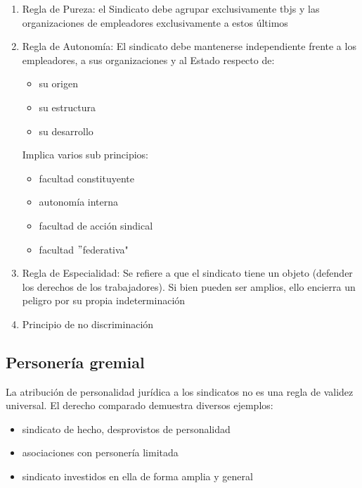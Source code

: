 \documentclass[spanish,12pt,a4paper,titlepage]{report}
\begin{document}
\begin{enumerate}
\item Regla de Pureza: el Sindicato debe agrupar exclusivamente tbjs y las organizaciones de empleadores exclusivamente a estos últimos
\item Regla de Autonomía: El sindicato debe mantenerse independiente frente a los empleadores, a sus organizaciones y al Estado respecto de:
	\begin{itemize}
	\item su origen
	\item su estructura
	\item su desarrollo
	\end{itemize}

Implica varios sub principios:
	\begin{itemize}
	\item facultad constituyente
	\item autonomía interna
	\item facultad de acción sindical
	\item facultad $"$federativa"
	\end{itemize}
	
\item Regla de Especialidad: Se refiere a que el sindicato tiene un objeto (defender los derechos de los trabajadores). Si bien pueden ser amplios, ello encierra un peligro por su propia indeterminación
\item Principio de no discriminación
\end{enumerate}

\subsection{Personería gremial}
La atribución de personalidad jurídica a los sindicatos no es una regla de validez universal.
El derecho comparado demuestra diversos ejemplos:
\begin{itemize}
\item sindicato de hecho, desprovistos de personalidad
\item asociaciones con personería limitada
\item sindicato investidos en ella de forma amplia y general
\end{itemize}
\end{document}
